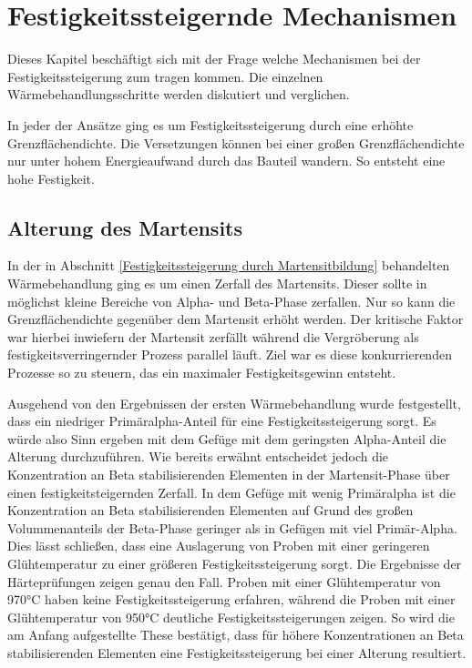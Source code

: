 \documentclass[a4paper, 11pt]{tubsreprt}
\begin{document}
\chapter{Festigkeitssteigernde Mechanismen}
Dieses Kapitel beschäftigt sich mit der Frage welche Mechanismen bei der Festigkeitssteigerung zum tragen kommen. Die einzelnen Wärmebehandlungsschritte werden diskutiert und verglichen.

In jeder der Ansätze ging es um Festigkeitssteigerung durch eine erhöhte Grenzflächendichte. Die Versetzungen können bei einer großen Grenzflächendichte nur unter hohem Energieaufwand durch das Bauteil wandern. So entsteht eine hohe Festigkeit.
\section{Alterung des Martensits}
In der in Abschnitt \ref{Festigkeitssteigerung durch Martensitbildung} behandelten Wärmebehandlung ging es um einen Zerfall des Martensits. Dieser sollte in möglichst kleine Bereiche von Alpha- und Beta-Phase zerfallen. Nur so kann die Grenzflächendichte gegenüber dem Martensit erhöht werden. Der kritische Faktor war hierbei inwiefern der Martensit zerfällt während die Vergröberung als festigkeitsverringernder Prozess parallel läuft. Ziel war es diese konkurrierenden Prozesse so zu steuern, das ein maximaler Festigkeitsgewinn entsteht. 

Ausgehend von den Ergebnissen der ersten Wärmebehandlung wurde festgestellt, dass ein niedriger Primäralpha-Anteil für eine Festigkeitssteigerung sorgt. Es würde also Sinn ergeben mit dem Gefüge mit dem geringsten Alpha-Anteil die Alterung durchzuführen. Wie bereits erwähnt entscheidet jedoch die Konzentration an Beta stabilisierenden Elementen in der Martensit-Phase über einen festigkeitsteigernden Zerfall. In dem Gefüge mit wenig Primäralpha ist die Konzentration an Beta stabilisierenden Elementen auf Grund des großen Volummenanteils der Beta-Phase geringer als in Gefügen mit viel Primär-Alpha. Dies lässt schließen, dass eine Auslagerung von Proben mit einer geringeren Glühtemperatur zu einer größeren Festigkeitssteigerung sorgt. Die Ergebnisse der Härteprüfungen zeigen genau den Fall. Proben mit einer Glühtemperatur von 970°C haben keine Festigkeitssteigerung erfahren, während die Proben mit einer Glühtemperatur von 950°C deutliche Festigkeitssteigerungen zeigen. So wird die am Anfang aufgestellte These bestätigt, dass für höhere Konzentrationen an Beta stabilisierenden Elementen eine Festigkeitssteigerung bei einer Alterung resultiert. 
\end{document}
